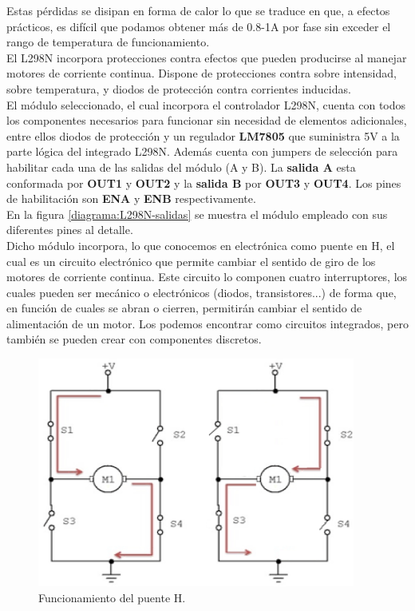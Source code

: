 Estas pérdidas se disipan en forma de calor lo que se traduce en que, a efectos prácticos, es difícil que podamos obtener más de 0.8-1A por fase sin exceder el rango de temperatura de funcionamiento.\\

El L298N incorpora protecciones contra efectos que pueden producirse al manejar motores de corriente continua. Dispone de protecciones contra sobre intensidad, sobre temperatura, y diodos de protección
contra corrientes inducidas.\\

El módulo seleccionado, el cual incorpora el controlador L298N, cuenta con todos los componentes necesarios para funcionar sin necesidad de elementos adicionales, entre ellos diodos de protección
y un regulador \textbf{LM7805} que suministra 5V a la parte lógica del integrado L298N. Además cuenta con jumpers de selección para habilitar cada una de las salidas del módulo (A y B).
La \textbf{salida A} esta conformada por \textbf{OUT1} y \textbf{OUT2} y la \textbf{salida B} por \textbf{OUT3} y \textbf{OUT4}. Los pines de habilitación son \textbf{ENA} y \textbf{ENB} respectivamente.\\

En la figura \ref{diagrama:L298N-salidas} se muestra el módulo empleado con sus diferentes pines al detalle.\\

Dicho módulo incorpora, lo que conocemos en electrónica como puente en H, el cual es un circuito electrónico que permite cambiar el sentido de giro de los 
motores de corriente continua. Este circuito lo componen cuatro interruptores, los cuales pueden ser mecánico o electrónicos (diodos, transistores...) de forma que,
en función de cuales se abran o cierren, permitirán cambiar el sentido de alimentación de un motor.  Los podemos encontrar como circuitos integrados, pero también se
pueden crear con componentes discretos.

\begin{figure}[H]
  \begin{center}
    \includegraphics[scale=2]{imagenes/esquema_puente_h.png}
  \end{center}
  \caption{Funcionamiento del puente H.}
  \label{esquema:puente_h}
\end{figure}

